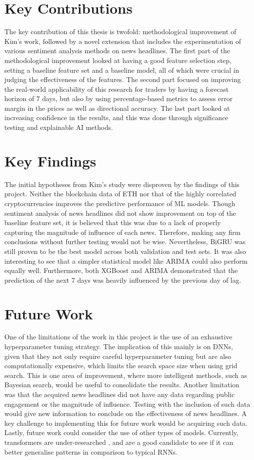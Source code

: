 \documentclass[ %
                    author={Raj Dhakan},
                supervisor={Dr. Ayush Joshi},
                    degree={MSc},
                     title={Ethereum Price Prediction using Internal and External Factors},
                  subtitle={},
                      type={},
                      year={2025}]{dissertation}
\begin{document}
\section{Key Contributions}
The key contribution of this thesis is twofold: methodological improvement of Kim's work, followed by a novel extension that includes the experimentation of various sentiment analysis methods on news headlines. The first part of the methodological improvement looked at having a good feature selection step, setting a baseline feature set and a baseline model, all of which were crucial in judging the effectiveness of the features. The second part focused on improving the real-world applicability of this research for traders by having a forecast horizon of 7 days, but also by using percentage-based metrics to assess error margin in the prices as well as directional accuracy. The last part looked at increasing confidence in the results, and this was done through significance testing and explainable AI methods. 

\section{Key Findings}
The initial hypotheses from Kim's study were disproven by the findings of this project. Neither the blockchain data of ETH nor that of the highly correlated cryptocurrencies improves the predictive performance of ML models. Though sentiment analysis of news headlines did not show improvement on top of the baseline feature set, it is believed that this was due to a lack of properly capturing the magnitude of influence of each news. Therefore, making any firm conclusions without further testing would not be wise. Nevertheless, BiGRU was still proven to be the best model across both validation and test sets. It was also interesting to see that a simpler statistical model like ARIMA could also perform equally well. Furthermore, both XGBoost and ARIMA demonstrated that the prediction of the next 7 days was heavily influenced by the previous day of lag. 

\section{Future Work}
One of the limitations of the work in this project is the use of an exhaustive hyperparameter tuning strategy. The implication of this mainly is on DNNs, given that they not only require careful hyperparameter tuning but are also computationally expensive, which limits the search space size when using grid search. This is one area of improvement, where more intelligent methods, such as Bayesian search, would be useful to consolidate the results. Another limitation was that the acquired news headlines did not have any data regarding public engagement or the magnitude of influence. Testing with the inclusion of such data would give new information to conclude on the effectiveness of news headlines. A key challenge to implementing this for future work would be acquiring such data. Lastly, future work could consider the use of other types of models. Currently, transformers are under-researched \cite{john2024cryptocurrency}, and are a good candidate to see if it can better generalise patterns in comparison to typical RNNs. 
\end{document}
